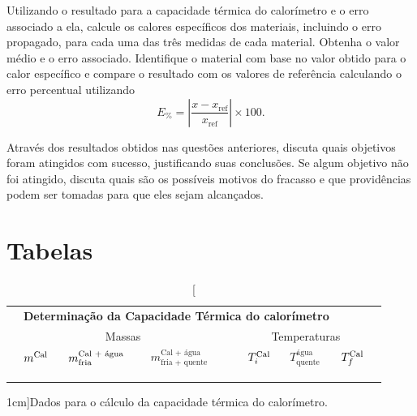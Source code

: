 \begin{question}[type={exam}]{2}
Utilizando o resultado para a capacidade térmica do calorímetro e o erro associado a ela, calcule os calores específicos dos materiais, incluindo o erro propagado, para cada uma das três medidas de cada material. Obtenha o valor médio e o erro associado. Identifique o material com base no valor obtido para o calor específico e compare o resultado com os valores de referência calculando o erro percentual utilizando
\begin{equation}
	E_{\%} = \left|\frac{x-x_{\textrm{ref}}}{x_{\textrm{ref}}}\right| \times 100.
\end{equation}
\end{question}

\begin{question}[type={exam}]{2}
Através dos resultados obtidos nas questões anteriores, discuta quais objetivos foram atingidos com sucesso, justificando suas conclusões. Se algum objetivo não foi atingido, discuta quais são os possíveis motivos do fracasso e que providências podem ser tomadas para que eles sejam alcançados.
\end{question}

\vfill
\pagebreak
\section{Tabelas}

\begin{table}[!ht]
\centering
	\begin{tabular}{lp{22mm}p{22mm}p{22mm}lp{22mm}p{22mm}p{22mm}l}
		\toprule
		&\multicolumn{6}{l}{\textbf{Determinação da Capacidade Térmica do calorímetro}}\\
		\cmidrule{2-8}
		&\multicolumn{3}{c}{Massas} & & \multicolumn{3}{c}{Temperaturas}& \\
		\cmidrule{2-4}\cmidrule{6-8}
		& $m^{\rm{Cal}}$ & $m^{\textrm{Cal + água}}_{\rm{fria}}$ & $m^{\textrm{Cal + água}}_{\textrm{fria + quente}}$ & & $T^{\rm{Cal}}_{i}$ & $T^{\textrm{água}}_{\textrm{quente}}$ & $T^{\rm{Cal}}_{f}$ & \\
		\cmidrule{2-4}\cmidrule{6-8}
		& \cellcolor[gray]{0.95} & \cellcolor[gray]{0.97} & \cellcolor[gray]{0.95} & & \cellcolor[gray]{0.95} & \cellcolor[gray]{0.97} & \cellcolor[gray]{0.95} & \\
		& \cellcolor[gray]{0.89} & \cellcolor[gray]{0.92} & \cellcolor[gray]{0.89} & & \cellcolor[gray]{0.89} & \cellcolor[gray]{0.92} & \cellcolor[gray]{0.89} & \\
		& \cellcolor[gray]{0.95} & \cellcolor[gray]{0.97} & \cellcolor[gray]{0.95} & & \cellcolor[gray]{0.95} & \cellcolor[gray]{0.97} & \cellcolor[gray]{0.95} & \\
		\cmidrule{2-8}
		\bottomrule
	\end{tabular}
	\caption[][1cm]{Dados para o cálculo da capacidade térmica do calorímetro.}
	\label{Tab:CapacidadeTermica}
\end{table}

